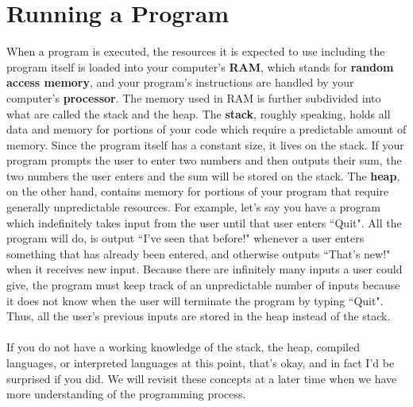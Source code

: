 \documentclass{article}
\begin{document}
\section*{Running a Program}
When a program is executed, the resources it is expected to use including the program itself is loaded into your 
computer's \textbf{RAM}, which stands for \textbf{random access memory}, and your program's instructions are handled by
your computer's \textbf{processor}. The memory used in RAM is further subdivided
into what are called the stack and the heap. The \textbf{stack}, roughly speaking, holds all data and memory for 
portions of your code which require a predictable amount of memory. Since the program itself has a constant size, it
lives on the stack. If your program prompts the user to enter two numbers and then outputs their sum, the two numbers
the user enters and the sum will be stored on the stack. The \textbf{heap}, on the other hand, contains memory for 
portions of your program that require generally unpredictable resources. For example, let's say you have a program 
which indefinitely takes input from the user until that user enters ``Quit". All the program will do, is output 
``I've seen that before!" whenever a user enters something that has already been entered, and otherwise outputs 
``That's new!" when it receives new input. Because there are infinitely many inputs a user could give, the program must 
keep track of an unpredictable number of inputs because it does not know when the user will terminate the program by
typing ``Quit". Thus, all the user's previous inputs are stored in the heap instead of the stack. \\ \\
If you do not have a working knowledge of the stack, the heap, compiled languages, or interpreted languages at this 
point, that's okay, and in fact I'd be surprised if you did. We will revisit these concepts at a later time when we 
have more understanding of the programming process.
\end{document}
